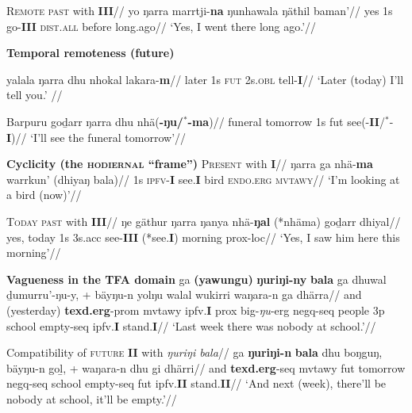\documentclass[11pt,dvipsnames]{article}
\begin{document}
\a
{}\begingl\glpreamble\textsc{Remote past} with \textbf{III}//
\gla yo ŋarra marrtji-\textbf{na} ŋunhawala ŋäthil baman'//
\glb yes 1s go-\textbf{III} \textsc{dist.all} before long.ago//
\glft`Yes, I went there long ago.'//
\endgl
\xe

\pex{}\textbf{Temporal remoteness (future)}

\a{}\begingl\gla yalala ŋarra dhu nhokal lakara-\textbf{m}//
\glb later 1s \textsc{fut} 2s\textsc{.obl} tell-\textbf{I}//
\glft `Later (today) I'll tell you.' //\endgl

\a\begingl{}\gla Barpuru goḏarr ŋarra dhu nhä(\textbf{-ŋu/$^*$-ma})//
\glb funeral tomorrow 1s \gls{fut} see(-\textbf{II}/$^*$-\textbf{I})//
\glft `I'll see the funeral tomorrow'\trailingcitation{[AW~20180730]}//\endgl
\xe


\pex\textbf{Cyclicity (the \textsc{hodiernal} ``frame'')}
\a{}\begingl\glpreamble\textsc{Present} with \textbf{I}//
\gla ŋarra ga nhä-\textbf{ma} warrkun' (dhiyaŋ bala)//
\glb 1s \textsc{ipfv}-\textbf{I} see.\textbf{I} bird \textsc{endo}.\textsc{erg} \textsc{mvtawy}//
\glft`I'm looking at a bird (now)'//
\endgl

\a{}\begingl\glpreamble\textsc{Today past} with \textbf{III}//
\gla ŋe gäthur ŋarra ŋanya nhä-\textbf{ŋal} (*nhäma) goḏarr dhiyal//
\glb	yes, today 1s 3s{\sc.acc} see-\textbf{III} (*see.\textbf{I}) morning {\sc prox-loc}//
\glft`Yes, I saw him here this morning'//\endgl

\xe

\pex\textbf{Vagueness in the TFA domain}
\a\begingl\gla ga \textbf{(yawungu)} \textbf{ŋuriŋi-ny} \textbf{bala} ga dhuwal ḏumurru'-ŋu-y, + bäyŋu-n yolŋu walal wukirri waŋara-n ga dhärra//
\glb and (yesterday) \textbf{\gls{texd}.\gls{erg}}-\gls{prom} \gls{mvtawy} \gls{ipfv}.\textbf{I} \gls{prox} big-\textit{ŋu}-\gls{erg} \gls{negq}-\gls{seq} people 3p school empty-\gls{seq} \gls{ipfv}.\textbf{I} stand.\textbf{I}//
\glft`Last week there was nobody at school.'//\endgl

\a{}\begingl Compatibility of \textsc{future} \textbf{II} with \textit{ŋuriŋi bala}\glpreamble//
\gla ga \textbf{ŋuriŋi-n} \textbf{bala} dhu boŋguŋ, bäyŋu-n goḻ, + waŋara-n dhu gi dhärri//
\glb and \textbf{\gls{texd}.\gls{erg}}-\gls{seq} \gls{mvtawy} \gls{fut} tomorrow  \gls{negq}-\gls{seq} school empty-\gls{seq} \gls{fut} \gls{ipfv}.\textbf{II} stand.\textbf{II}//
\glft`And next (week), there'll be nobody at school, it'll be empty.'//\endgl
\end{document}
